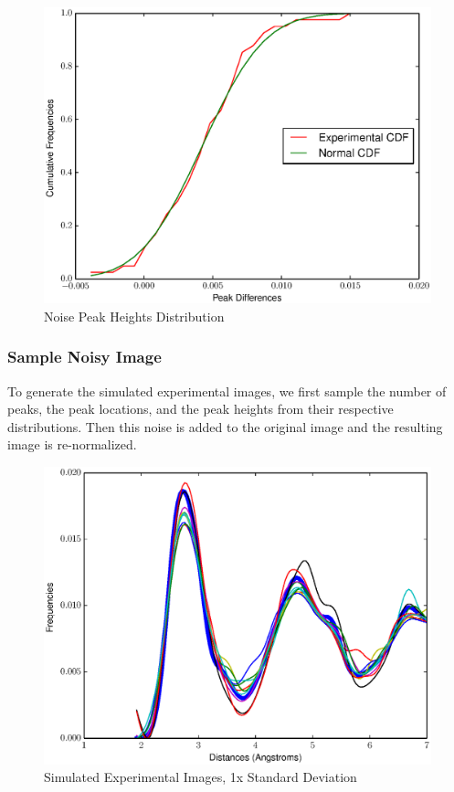\documentclass[12pt,letterpaper]{article}
\begin{document}
\begin{figure}[ht]
  \begin{center}
    \includegraphics[scale=0.8]{figs/noise_peak_cdf.eps}
    \caption{Noise Peak Heights Distribution}
  \end{center}
\end{figure}
\clearpage

\subsubsection{Sample Noisy Image}
To generate the simulated experimental images, we first sample the number of
peaks, the peak locations, and the peak heights from their respective
distributions. Then this noise is added to the original image and the resulting
image is re-normalized.

\begin{figure}[ht]
  \begin{center}
    \includegraphics[scale=0.8]{figs/RandomImgs1x.eps}
    \caption{Simulated Experimental Images, 1x Standard Deviation}
  \end{center}
\end{figure}
\end{document}
